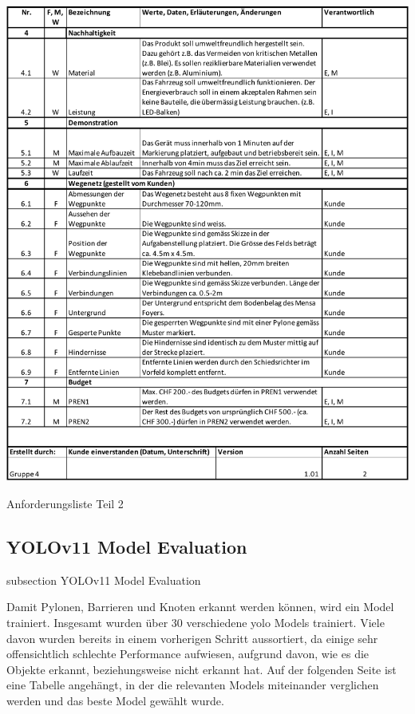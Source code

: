 \begin{table}[H]
\centering
\includegraphics[width=\textwidth]{assets/projektmanagement/Anforderungsliste_V1.01_page2.pdf}
\caption{Anforderungsliste Teil 2}
\label{table:anforderungsliste_page2}
\end{table}
\newpage



\subsection*{YOLOv11 Model Evaluation}\label{model-evaluation}
    {subsection}
    {YOLOv11 Model Evaluation}

Damit Pylonen, Barrieren und Knoten erkannt werden können, wird ein Model trainiert. Insgesamt wurden über 30 verschiedene \gls{yolo} Models trainiert. Viele davon wurden bereits in einem vorherigen Schritt aussortiert, da einige sehr offensichtlich schlechte Performance aufwiesen, aufgrund davon, wie es die Objekte erkannt, beziehungsweise nicht erkannt hat. Auf der folgenden Seite ist eine Tabelle angehängt, in der die relevanten Models miteinander verglichen werden und das beste Model gewählt wurde.

